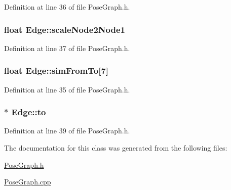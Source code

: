 \-Definition at line 36 of file \-Pose\-Graph.\-h.

\hypertarget{classEdge_a7c93e09bb582c2044e1db881bd55627b}{
\subsubsection[{scale\-Node2\-Node1}]{\setlength{\rightskip}{0pt plus 5cm}float {\bf \-Edge\-::scale\-Node2\-Node1}}}\label{classEdge_a7c93e09bb582c2044e1db881bd55627b}


\-Definition at line 37 of file \-Pose\-Graph.\-h.

\hypertarget{classEdge_ac612d1d9593c51a94b24d4c602289e3d}{
\subsubsection[{sim\-From\-To}]{\setlength{\rightskip}{0pt plus 5cm}float {\bf \-Edge\-::sim\-From\-To}\mbox{[}7\mbox{]}}}\label{classEdge_ac612d1d9593c51a94b24d4c602289e3d}


\-Definition at line 35 of file \-Pose\-Graph.\-h.

\hypertarget{classEdge_a7a09acfaaccec8241ee0c00a3b5c1354}{
\subsubsection[{to}]{ $\ast$ {\bf \-Edge\-::to}}}\label{classEdge_a7a09acfaaccec8241ee0c00a3b5c1354}


\-Definition at line 39 of file \-Pose\-Graph.\-h.



\-The documentation for this class was generated from the following files\-:\begin{DoxyCompactItemize}
\item 
\hyperlink{PoseGraph_8h}{\-Pose\-Graph.\-h}\item 
\hyperlink{PoseGraph_8cpp}{\-Pose\-Graph.\-cpp}\end{DoxyCompactItemize}
